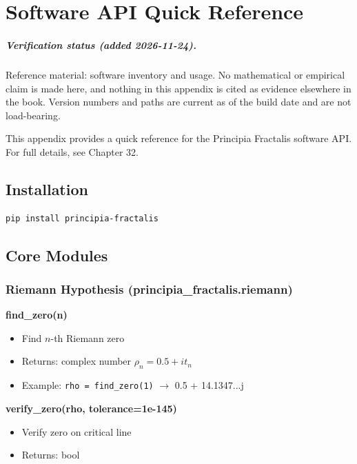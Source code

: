 \chapter{Software API Quick Reference}
\label{app:software}

\paragraph{Verification status (added 2026-11-24).} Reference material: software
inventory and usage. No mathematical or empirical claim is made here, and
nothing in this appendix is cited as evidence elsewhere in the book. Version
numbers and paths are current as of the build date and are not load-bearing.

This appendix provides a quick reference for the Principia Fractalis software API. For full details, see Chapter 32.

\section{Installation}

\begin{verbatim}
pip install principia-fractalis
\end{verbatim}

\section{Core Modules}

\subsection{Riemann Hypothesis (principia\_fractalis.riemann)}

\textbf{find\_zero(n)}
\begin{itemize}
\item Find $n$-th Riemann zero
\item Returns: complex number $\rho_n = 0.5 + it_n$
\item Example: \texttt{rho = find\_zero(1)} $\rightarrow$ 0.5 + 14.1347...j
\end{itemize}

\textbf{verify\_zero(rho, tolerance=1e-145)}
\begin{itemize}
\item Verify zero on critical line
\item Returns: bool
\end{itemize}

